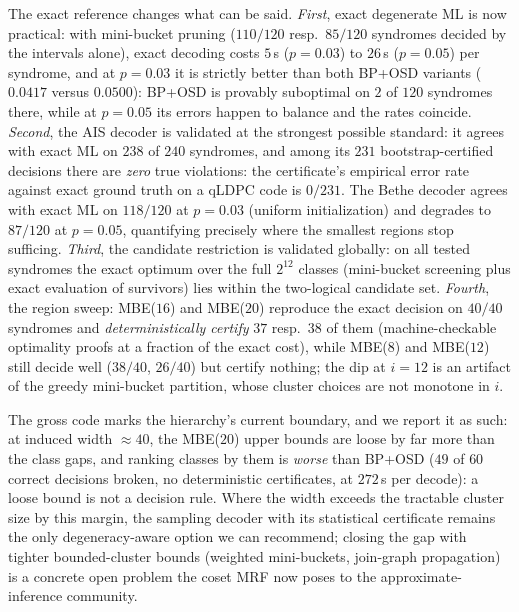 \documentclass[a4paper,11pt]{quantumarticle}
\theoremstyle{definition}
\begin{document}
The exact reference changes what can be said. \emph{First}, exact
degenerate ML is now practical: with mini-bucket pruning ($110/120$ resp.\
$85/120$ syndromes decided by the intervals alone), exact decoding costs
$5$\,s ($p=0.03$) to $26$\,s ($p=0.05$) per syndrome, and at $p=0.03$ it
is strictly better than both BP+OSD variants ($0.0417$ versus $0.0500$):
BP+OSD is provably suboptimal on $2$ of $120$ syndromes there, while at
$p=0.05$ its errors happen to balance and the rates coincide.
\emph{Second}, the AIS decoder is validated at the strongest possible
standard: it agrees with exact ML on $238$ of $240$ syndromes, and among
its $231$ bootstrap-certified decisions there are \emph{zero} true
violations: the certificate's empirical error rate against exact ground
truth on a qLDPC code is $0/231$. The Bethe decoder agrees with exact ML
on $118/120$ at $p=0.03$ (uniform initialization) and degrades to
$87/120$ at $p=0.05$, quantifying precisely where the smallest regions
stop sufficing. \emph{Third}, the candidate restriction is validated
globally: on all tested syndromes the exact optimum over the full
$2^{12}$ classes (mini-bucket screening plus exact evaluation of
survivors) lies within the two-logical candidate set.
\emph{Fourth}, the region sweep: MBE($16$) and MBE($20$) reproduce the
exact decision on $40/40$ syndromes and \emph{deterministically certify}
$37$ resp.\ $38$ of them (machine-checkable optimality proofs at a
fraction of the exact cost), while MBE($8$) and MBE($12$) still decide
well ($38/40$, $26/40$) but certify nothing; the dip at $i=12$ is an
artifact of the greedy mini-bucket partition, whose cluster choices are
not monotone in $i$.

The gross code marks the hierarchy's current boundary, and we report it as
such: at induced width $\approx40$, the MBE($20$) upper bounds are loose
by far more than the class gaps, and ranking classes by them is
\emph{worse} than BP+OSD ($49$ of $60$ correct decisions broken, no
deterministic certificates, at $272$\,s per decode): a loose bound is not
a decision rule. Where the width exceeds the tractable cluster size by
this margin, the sampling decoder with its statistical certificate remains
the only degeneracy-aware option we can recommend; closing the gap with
tighter bounded-cluster bounds (weighted mini-buckets, join-graph
propagation) is a concrete open problem the coset MRF now poses to the
approximate-inference community.
\end{document}
